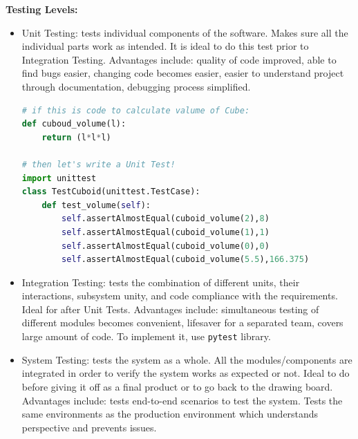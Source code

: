 \documentclass[11pt]{article}
\begin{document}
\noindent \textbf{Testing Levels:}
\begin{itemize}
    \item Unit Testing: tests individual components of the software. Makes sure all the individual parts work as intended. It is ideal to do this test prior to Integration Testing. Advantages include: quality of code improved, able to find bugs easier, changing code becomes easier, easier to understand project through documentation, debugging process simplified.
        \begin{lstlisting}[language=python, mathescape=true]
# if this is code to calculate valume of Cube:
def cuboud_volume(l):
    return (l*l*l)

# then let's write a Unit Test!
import unittest
class TestCuboid(unittest.TestCase):
    def test_volume(self):
        self.assertAlmostEqual(cuboid_volume(2),8)
        self.assertAlmostEqual(cuboid_volume(1),1)
        self.assertAlmostEqual(cuboid_volume(0),0)
        self.assertAlmostEqual(cuboid_volume(5.5),166.375)
        \end{lstlisting}
    \item Integration Testing: tests the combination of different units, their interactions, subsystem unity, and code compliance with the requirements. Ideal for after Unit Tests. Advantages include: simultaneous testing of different modules becomes convenient, lifesaver for a separated team, covers large amount of code. To implement it, use \texttt{pytest} library.
    \item System Testing: tests the system as a whole. All the modules/components are integrated in order to verify the system works as expected or not. Ideal to do before giving it off as a final product or to go back to the drawing board. Advantages include: tests end-to-end scenarios to test the system. Tests the same environments as the production environment which understands perspective and prevents issues.
\end{itemize}
\end{document}
